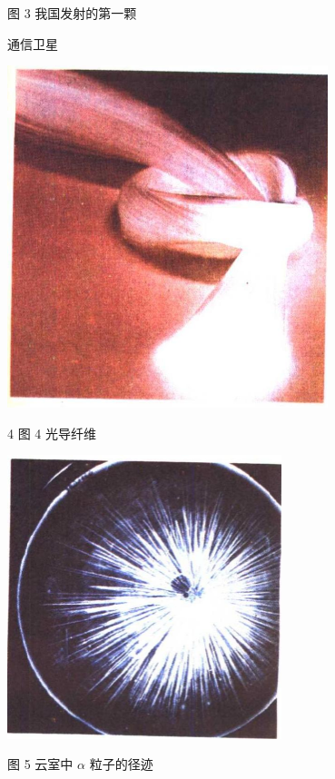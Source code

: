 \documentclass[10pt]{article}
\begin{document}
图 3 我国发射的第一颗

通信卫星

\begin{center}
\includegraphics[max width=0.7\textwidth]{images/01913056-1f15-74d8-9184-9aab52c9d66b_4_564823.jpg}
\end{center}

4 图 4 光导纤维

\begin{center}
\includegraphics[max width=0.6\textwidth]{images/01913056-1f15-74d8-9184-9aab52c9d66b_4_181375.jpg}
\end{center}

图 5 云室中 \(\alpha\) 粒子的径迹
\end{document}
